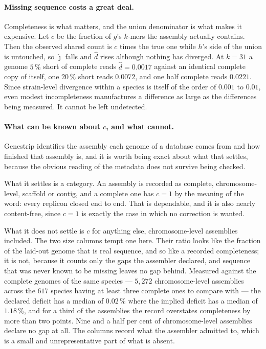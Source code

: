 \documentclass[pdflatex,sn-vancouver-num]{sn-jnl}
\begin{document}
\paragraph{Missing sequence costs a great deal.} Completeness is what matters, and the union
denominator is what makes it expensive. Let $c$ be the fraction of $g$'s $k$-mers the assembly
actually contains. Then the observed shared count is $c$ times the true one while $h$'s side of the
union is untouched, so $\widehat{\jmath}$ falls and $\widehat{d}$ rises although nothing has diverged.
At $k = 31$ a genome $5\,\%$ short of complete reads $\widehat{d} = 0.0017$ against an identical
complete copy of itself, one $20\,\%$ short reads $0.0072$, and one half complete reads $0.0221$.
Since strain-level divergence within a species is itself of the order of $0.001$ to $0.01$, even
modest incompleteness manufactures a difference as large as the differences being measured. It cannot
be left undetected.

\paragraph{What can be known about $c$, and what cannot.} Genestrip identifies the assembly each
genome of a database comes from and how finished that assembly is, and it is worth being exact about
what that settles, because the obvious reading of the metadata does not survive being checked.

What it settles is a category. An assembly is recorded as complete, chromosome-level, scaffold or
contig, and a complete one has $c = 1$ by the meaning of the word: every replicon closed end to end.
That is dependable, and it is also nearly content-free, since $c = 1$ is exactly the case in which no
correction is wanted.

What it does not settle is $c$ for anything else, chromosome-level assemblies included. The two size
columns tempt one here. Their ratio looks like the fraction of the laid-out genome that is real
sequence, and so like a recorded completeness; it is not, because it counts only the gaps the
assembler declared, and sequence that was never known to be missing leaves no gap behind. Measured
against the complete genomes of the same species --- $5{,}272$ chromosome-level assemblies across the
$617$ species having at least three complete ones to compare with --- the declared deficit has a
median of $0.02\,\%$ where the implied deficit has a median of $1.18\,\%$, and for a third of the
assemblies the record overstates completeness by more than two points. Nine and a half per cent of
chromosome-level assemblies declare no gap at all. The columns record what the assembler admitted to,
which is a small and unrepresentative part of what is absent.
\end{document}

